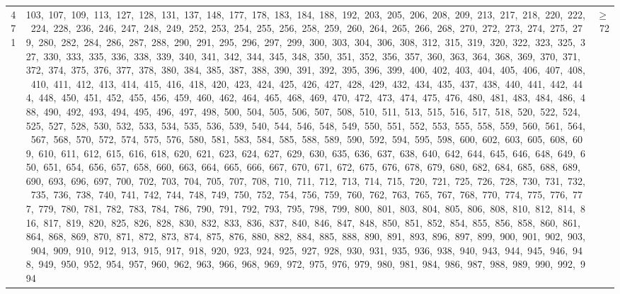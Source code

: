 \begin{longtable}{c|p{}|r}
471 & 103,\ 107,\ 109,\ 113,\ 127,\ 128,\ 131,\ 137,\ 148,\ 177,\ 178,\ 183,\ 184,\ 188,\ 192,\ 203,\ 205,\ 206,\ 208,\ 209,\ 213,\ 217,\ 218,\ 220,\ 222,\ 224,\ 228,\ 236,\ 246,\ 247,\ 248,\ 249,\ 252,\ 253,\ 254,\ 255,\ 256,\ 258,\ 259,\ 260,\ 264,\ 265,\ 266,\ 268,\ 270,\ 272,\ 273,\ 274,\ 275,\ 279,\ 280,\ 282,\ 284,\ 286,\ 287,\ 288,\ 290,\ 291,\ 295,\ 296,\ 297,\ 299,\ 300,\ 303,\ 304,\ 306,\ 308,\ 312,\ 315,\ 319,\ 320,\ 322,\ 323,\ 325,\ 327,\ 330,\ 333,\ 335,\ 336,\ 338,\ 339,\ 340,\ 341,\ 342,\ 344,\ 345,\ 348,\ 350,\ 351,\ 352,\ 356,\ 357,\ 360,\ 363,\ 364,\ 368,\ 369,\ 370,\ 371,\ 372,\ 374,\ 375,\ 376,\ 377,\ 378,\ 380,\ 384,\ 385,\ 387,\ 388,\ 390,\ 391,\ 392,\ 395,\ 396,\ 399,\ 400,\ 402,\ 403,\ 404,\ 405,\ 406,\ 407,\ 408,\ 410,\ 411,\ 412,\ 413,\ 414,\ 415,\ 416,\ 418,\ 420,\ 423,\ 424,\ 425,\ 426,\ 427,\ 428,\ 429,\ 432,\ 434,\ 435,\ 437,\ 438,\ 440,\ 441,\ 442,\ 444,\ 448,\ 450,\ 451,\ 452,\ 455,\ 456,\ 459,\ 460,\ 462,\ 464,\ 465,\ 468,\ 469,\ 470,\ 472,\ 473,\ 474,\ 475,\ 476,\ 480,\ 481,\ 483,\ 484,\ 486,\ 488,\ 490,\ 492,\ 493,\ 494,\ 495,\ 496,\ 497,\ 498,\ 500,\ 504,\ 505,\ 506,\ 507,\ 508,\ 510,\ 511,\ 513,\ 515,\ 516,\ 517,\ 518,\ 520,\ 522,\ 524,\ 525,\ 527,\ 528,\ 530,\ 532,\ 533,\ 534,\ 535,\ 536,\ 539,\ 540,\ 544,\ 546,\ 548,\ 549,\ 550,\ 551,\ 552,\ 553,\ 555,\ 558,\ 559,\ 560,\ 561,\ 564,\ 567,\ 568,\ 570,\ 572,\ 574,\ 575,\ 576,\ 580,\ 581,\ 583,\ 584,\ 585,\ 588,\ 589,\ 590,\ 592,\ 594,\ 595,\ 598,\ 600,\ 602,\ 603,\ 605,\ 608,\ 609,\ 610,\ 611,\ 612,\ 615,\ 616,\ 618,\ 620,\ 621,\ 623,\ 624,\ 627,\ 629,\ 630,\ 635,\ 636,\ 637,\ 638,\ 640,\ 642,\ 644,\ 645,\ 646,\ 648,\ 649,\ 650,\ 651,\ 654,\ 656,\ 657,\ 658,\ 660,\ 663,\ 664,\ 665,\ 666,\ 667,\ 670,\ 671,\ 672,\ 675,\ 676,\ 678,\ 679,\ 680,\ 682,\ 684,\ 685,\ 688,\ 689,\ 690,\ 693,\ 696,\ 697,\ 700,\ 702,\ 703,\ 704,\ 705,\ 707,\ 708,\ 710,\ 711,\ 712,\ 713,\ 714,\ 715,\ 720,\ 721,\ 725,\ 726,\ 728,\ 730,\ 731,\ 732,\ 735,\ 736,\ 738,\ 740,\ 741,\ 742,\ 744,\ 748,\ 749,\ 750,\ 752,\ 754,\ 756,\ 759,\ 760,\ 762,\ 763,\ 765,\ 767,\ 768,\ 770,\ 774,\ 775,\ 776,\ 777,\ 779,\ 780,\ 781,\ 782,\ 783,\ 784,\ 786,\ 790,\ 791,\ 792,\ 793,\ 795,\ 798,\ 799,\ 800,\ 801,\ 803,\ 804,\ 805,\ 806,\ 808,\ 810,\ 812,\ 814,\ 816,\ 817,\ 819,\ 820,\ 825,\ 826,\ 828,\ 830,\ 832,\ 833,\ 836,\ 837,\ 840,\ 846,\ 847,\ 848,\ 850,\ 851,\ 852,\ 854,\ 855,\ 856,\ 858,\ 860,\ 861,\ 864,\ 868,\ 869,\ 870,\ 871,\ 872,\ 873,\ 874,\ 875,\ 876,\ 880,\ 882,\ 884,\ 885,\ 888,\ 890,\ 891,\ 893,\ 896,\ 897,\ 899,\ 900,\ 901,\ 902,\ 903,\ 904,\ 909,\ 910,\ 912,\ 913,\ 915,\ 917,\ 918,\ 920,\ 923,\ 924,\ 925,\ 927,\ 928,\ 930,\ 931,\ 935,\ 936,\ 938,\ 940,\ 943,\ 944,\ 945,\ 946,\ 948,\ 949,\ 950,\ 952,\ 954,\ 957,\ 960,\ 962,\ 963,\ 966,\ 968,\ 969,\ 972,\ 975,\ 976,\ 979,\ 980,\ 981,\ 984,\ 986,\ 987,\ 988,\ 989,\ 990,\ 992,\ 994 & $\ge$ 72 \\

\end{longtable}
